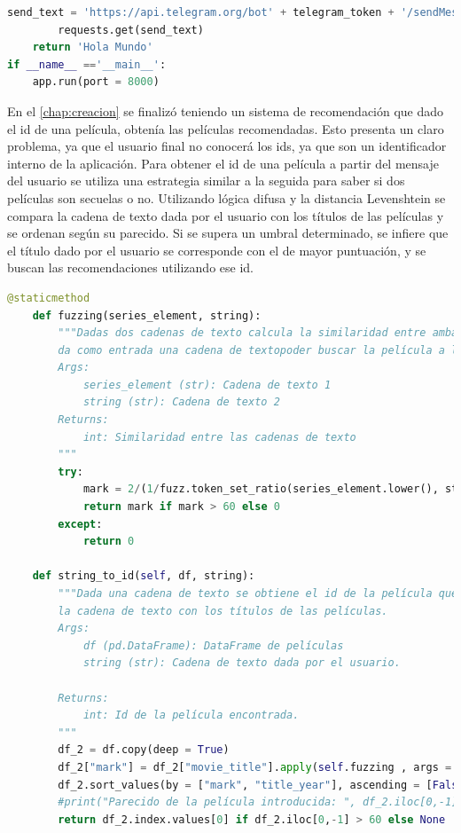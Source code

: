 \begin{lstlisting}[language=Python, label = {lst:API}, caption= Creación de la API del sistema de recomendación en Python usando Flask.]
        send_text = 'https://api.telegram.org/bot' + telegram_token + '/sendMessage?chat_id=' + chat_id + '&parse_mode=Markdown&text=' + answer
        requests.get(send_text)
    return 'Hola Mundo'
if __name__ =='__main__':
    app.run(port = 8000)
\end{lstlisting}

En el \autoref{chap:creacion} se finalizó teniendo un sistema de recomendación que dado el id de una película, obtenía las películas recomendadas. Esto presenta un claro problema, ya que el usuario final no conocerá los ids, ya que son un identificador interno de la aplicación. Para obtener el id de una película a partir del mensaje del usuario se utiliza una estrategia similar a la seguida para saber si dos películas son secuelas o no. Utilizando lógica difusa y la distancia Levenshtein se compara la cadena de texto dada por el usuario con los títulos de las películas y se ordenan según su parecido. Si se supera un umbral determinado, se infiere que el título dado por el usuario se corresponde con el de mayor puntuación, y se buscan las recomendaciones utilizando ese id.

\begin{lstlisting}[language=Python, label = {lst:API}, caption= Búsqueda del id de la película dada por el usuario.]
    @staticmethod
    def fuzzing(series_element, string):
        """Dadas dos cadenas de texto calcula la similaridad entre ambas. Se usa para cuando el usuario
        da como entrada una cadena de textopoder buscar la película a la que se refiere.
        Args:
            series_element (str): Cadena de texto 1
            string (str): Cadena de texto 2
        Returns:
            int: Similaridad entre las cadenas de texto
        """
        try:
            mark = 2/(1/fuzz.token_set_ratio(series_element.lower(), string.lower()) + 1/fuzz.ratio(series_element.lower(), string.lower()))
            return mark if mark > 60 else 0
        except:
            return 0

    def string_to_id(self, df, string):
        """Dada una cadena de texto se obtiene el id de la película que más se parece. Para ello se compara
        la cadena de texto con los títulos de las películas.
        Args:
            df (pd.DataFrame): DataFrame de películas
            string (str): Cadena de texto dada por el usuario.
        
        Returns:
            int: Id de la película encontrada.
        """
        df_2 = df.copy(deep = True)
        df_2["mark"] = df_2["movie_title"].apply(self.fuzzing , args = (string,))
        df_2.sort_values(by = ["mark", "title_year"], ascending = [False, True], inplace = True)
        #print("Parecido de la película introducida: ", df_2.iloc[0,-1])
        return df_2.index.values[0] if df_2.iloc[0,-1] > 60 else None
\end{lstlisting}

